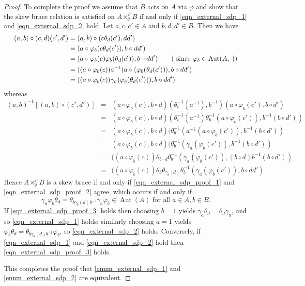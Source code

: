 \documentclass[10pt,a4paper]{amsart}
\DeclareMathOperator{\Aut}{\mbox{Aut}}
\begin{document}
\begin{proof}
To complete the proof we assume that $ B $ acts on $ A $ via $ \varphi $ and show that the skew brace relation is satisfied on $ A \rtimes_{\theta}^{\varphi} B $ if and only if \eqref{eqn_external_sdp_1} and \eqref{eqn_external_sdp_2} hold. Let $ a,c,c' \in A $ and $ b,d,d' \in B $. Then we have
\begin{align}
(a,b) \circ (c,d)(c',d') &= (a,b) \circ (c \theta_{d}(c'), dd') \nonumber \\
&= (a \circ \varphi_{b}(c\theta_{d}(c')), b \circ dd') \nonumber \\
&= (a \circ \varphi_{b}(c)\varphi_{b}(\theta_{d}(c')), b \circ dd') \tag{ since   $\varphi_{b} \in \Aut(A,\cdot)$}\nonumber \\
&= ((a \circ \varphi_{b}(c)) a^{-1} (a \circ (\varphi_{b}(\theta_{d}(c'))), b \circ dd') \nonumber \\
&= ((a \circ \varphi_{b}(c)) \gamma_{a}(\varphi_{b}(\theta_{d}(c'))), b \circ dd') \label{eqn_external_sdp_proof_1}
\end{align}
whereas
\begin{eqnarray}
[(a,b) \circ (c,d)](a,b)^{-1}[(a,b) \circ (c',d')] 
& = & (a \circ \varphi_{b}(c), b \circ d)(\theta_{b}^{-1}(a^{-1}),b^{-1})(a \circ \varphi_{b}(c'),b \circ d') \nonumber \\
& = & (a \circ \varphi_{b}(c), b \circ d)(\theta_{b}^{-1}(a^{-1})\theta_{b}^{-1}(a \circ \varphi_{b}(c')),b^{-1}(b \circ d')) \nonumber \\
& = & (a \circ \varphi_{b}(c), b \circ d)(\theta_{b}^{-1}(a^{-1}(a \circ \varphi_{b}(c')),b^{-1}(b \circ d')) \nonumber \\
& = & (a \circ \varphi_{b}(c), b \circ d)(\theta_{b}^{-1}(\gamma_{a}(\varphi_{b}(c')),b^{-1}(b \circ d')) \nonumber \\
& = & ((a \circ \varphi_{b}(c)) \theta_{b \circ d}\theta_{b}^{-1}(\gamma_{a}(\varphi_{b}(c')),(b \circ d)b^{-1}(b \circ d')) \nonumber \\
& = & ((a \circ \varphi_{b}(c)) \theta_{b}\theta_{\gamma_{b}(d)}\theta_{b}^{-1}(\gamma_{a}(\varphi_{b}(c')),b \circ dd') \label{eqn_external_sdp_proof_2}
\end{eqnarray}
Hence $ A \rtimes_{\theta}^{\varphi} B $ is a skew brace if and only if \eqref{eqn_external_sdp_proof_1} and \eqref{eqn_external_sdp_proof_2} agree, which occurs if and only if
\begin{equation} \label{eqn_external_sdp_proof_3}
\gamma_{a}\varphi_{b}\theta_{d} = \theta_{b\gamma_{b}(d)b^{-1}}\gamma_{a}\varphi_{b} \in \Aut(A) \mbox{ for all } a \in A, b \in B.
\end{equation}
If \eqref{eqn_external_sdp_proof_3} holds then choosing $ b=1 $ yields $ \gamma_{a} \theta_{d} = \theta_{d}\gamma_{a} $, and so \eqref{eqn_external_sdp_1} holds; similarly choosing $ a=1 $ yields $ \varphi_{b}\theta_{d} = \theta_{b\gamma_{b}(d)b^{-1}}\varphi_{b} $, so \eqref{eqn_external_sdp_2} holds. Conversely, if \eqref{eqn_external_sdp_1} and \eqref{eqn_external_sdp_2} hold then \eqref{eqn_external_sdp_proof_3} holds. 

This completes the proof that \ref{enum_external_sdp_1} and \ref{enum_external_sdp_2} are equivalent.
\end{proof}
\end{document}
